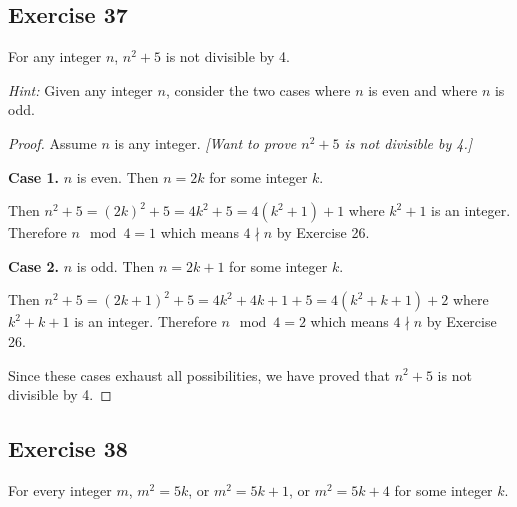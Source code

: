 \documentclass[14pt]{extarticle}
\begin{document}
\subsection{Exercise 37}
For any integer $n$, $n^2 + 5$ is not divisible by 4.

{\it Hint:} Given any integer $n$, consider the two cases where $n$ is even and where $n$ is odd.

\begin{proof}
Assume $n$ is any integer. {\it [Want to prove $n^2+5$ is not divisible by 4.]}

{\bf Case 1.} $n$ is even. Then $n = 2k$ for some integer $k$.

Then $n^2+5 = (2k)^2+5 = 4k^2+5 = 4(k^2+1)+1$ where $k^2+1$ is an integer. Therefore $n \mod 4 = 1$ which means $4 \nmid n$ by Exercise 26.

{\bf Case 2.} $n$ is odd. Then $n = 2k+1$ for some integer $k$.

Then $n^2+5 = (2k+1)^2+5 = 4k^2+4k+1+5 = 4(k^2+k+1)+2$ where $k^2+k+1$ is an integer. Therefore $n \mod 4 = 2$ which means $4 \nmid n$ by Exercise 26.

Since these cases exhaust all possibilities, we have proved that $n^2+5$ is not divisible by 4.
\end{proof}

\subsection{Exercise 38}
For every integer $m$, $m^2 = 5k$, or $m^2 = 5k + 1$, or $m^2 = 5k + 4$ for some integer $k$.
\end{document}
